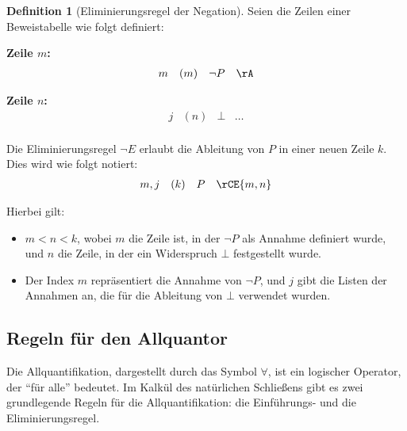 \documentclass{book}
\theoremstyle{plain}
\theoremstyle{remark}
\theoremstyle{definition}
\newtheorem{definition}{Definition}[section]
\begin{document}
\begin{definition}[Eliminierungsregel der Negation]
Seien die Zeilen einer Beweistabelle wie folgt definiert:

\textbf{Zeile \(m\):}
\[
\begin{array}{llll}
    m & (m) & \neg P & \rA \\
\end{array}
\]

\textbf{Zeile \(n\):}
\[
\begin{array}{llll}
    j & (n) & \bot & \dots \\
\end{array}
\]

Die Eliminierungsregel \(\neg E\) erlaubt die Ableitung von \(P\) in einer neuen Zeile \(k\). Dies wird wie folgt notiert:
\[
\begin{array}{llll}
    m, j & (k) & P & \rCE{m,n} \\
\end{array}
\]

Hierbei gilt:
\begin{itemize}
    \item \(m < n < k\), wobei \(m\) die Zeile ist, in der \(\neg P\) als Annahme definiert wurde, und \(n\) die Zeile, in der ein Widerspruch \(\bot\) festgestellt wurde.
    \item Der Index \(m\) repräsentiert die Annahme von \(\neg P\), und \(j\) gibt die Listen der Annahmen an, die für die Ableitung von \(\bot\) verwendet wurden.
\end{itemize}
\end{definition}

\subsection{Regeln für den Allquantor}

Die Allquantifikation, dargestellt durch das Symbol \(\forall\), ist ein logischer Operator, der \enquote{für alle} bedeutet. Im Kalkül des natürlichen Schließens gibt es zwei grundlegende Regeln für die Allquantifikation: die Einführungs- und die Eliminierungsregel.
\end{document}
